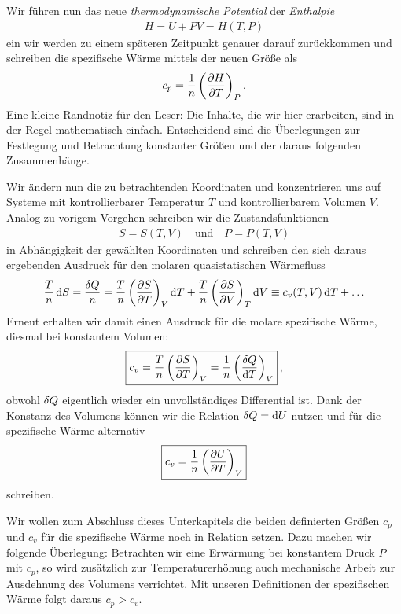 Wir führen nun das neue \emph{thermodynamische Potential} der \emph{Enthalpie}
\begin{align*}
    \boxed{H=U+PV=H(T,P)}
\end{align*}
ein \textendash{} wir werden zu einem späteren Zeitpunkt genauer darauf zurückkommen \textendash{} und schreiben die spezifische Wärme mittels der neuen Größe als
\begin{align*}
    c_p=\frac{1}{n}\left( \frac{\partial H}{\partial T}\right)_P.
\end{align*}
Eine kleine Randnotiz für den Leser: Die Inhalte, die wir hier erarbeiten, sind in der Regel mathematisch einfach. Entscheidend sind die Überlegungen zur Festlegung und Betrachtung konstanter Größen und der daraus folgenden Zusammenhänge.


Wir ändern nun die zu betrachtenden Koordinaten und konzentrieren uns auf Systeme mit kontrollierbarer Temperatur $T$ und kontrollierbarem Volumen $V$.
Analog zu vorigem Vorgehen schreiben wir die Zustandsfunktionen
\begin{align*}
    S=S(T,V)\quad\mathrm{und}\quad P=P(T,V)
\end{align*}
in Abhängigkeit der gewählten Koordinaten und schreiben den sich daraus ergebenden Ausdruck für den molaren quasistatischen Wärmefluss
\begin{align*}
    \frac{T}{n}\mathop{}\!\mathrm{d} S= \frac{\mathop{}\!\delta Q}{n}=\frac{T}{n}\left(\frac{\partial S}{\partial T}\right)_V \mathop{}\!\mathrm{d} T +\frac{T}{n}\left(\frac{\partial S}{\partial V}\right)_T \mathop{}\!\mathrm{d} V\equiv c_v(T,V)\mathop{}\!\mathrm{d} T+\ldots
\end{align*}
Erneut erhalten wir damit einen Ausdruck für die molare spezifische Wärme, diesmal bei konstantem Volumen:
\begin{align*}
    \boxed{c_v=\frac{T}{n}\left(\frac{\partial S}{\partial T}\right)_V=\frac{1}{n}\left(\frac{\mathop{}\!\delta Q}{\mathop{}\!\mathrm{d} T}\right)_V}\:,
\end{align*}
obwohl $\mathop{}\!\delta Q$ eigentlich wieder ein unvollständiges Differential ist. 
Dank der Konstanz des Volumens können wir die Relation $\mathop{}\!\delta Q=\mathop{}\!\mathrm{d} U$ nutzen und für die spezifische Wärme alternativ
\begin{align*}
    \boxed{c_v=\frac{1}{n}\left(\frac{\partial U}{\partial T}\right)_V}
\end{align*}
schreiben.

Wir wollen zum Abschluss dieses Unterkapitels die beiden definierten Größen $c_p$ und $c_v$ für die spezifische Wärme noch in Relation setzen. Dazu machen wir folgende Überlegung: Betrachten wir eine Erwärmung bei konstantem Druck $P$ mit $c_p$,
so wird zusätzlich zur Temperaturerhöhung auch mechanische Arbeit zur Ausdehnung des Volumens verrichtet. Mit unseren Definitionen der spezifischen Wärme folgt daraus \textbf{$c_p >c_v$}.



